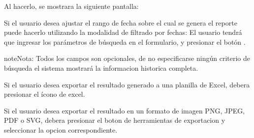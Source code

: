 \documentclass[a4paper,10pt,spanish]{sphinxmanual}
\begin{document}

Al hacerlo, se mostrara la siguiente pantalla:


Si el usuario desea ajustar el rango de fecha sobre el cual se genera el reporte puede hacerlo utilizando la modalidad de filtrado por fechas:
El usuario tendrá que ingresar los parámetros de búsqueda en el formulario, y presionar el botón .





\begin{notice}{note}{Nota:}
Todos los campos son opcionales, de no especificarse ningún criterio de búsqueda el sistema mostrará la informacion historica completa.
\end{notice}


Si el usuario desea exportar el resultado generado a una planilla de Excel, debera presionar el ícono de excel.


Si el usuario desea exportar el resultado en un formato de imagen PNG, JPEG, PDF o SVG, debera presionar el boton de herramientas de exportacion y seleccionar la opcion correspondiente.
\end{document}
